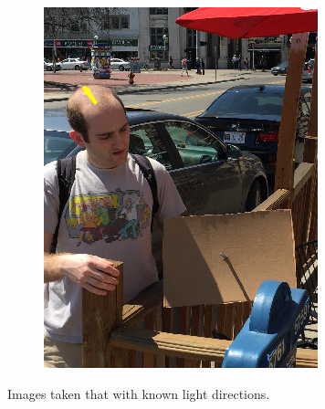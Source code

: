 \documentclass[10pt,twocolumn,letterpaper]{article}
\begin{document}
\begin{figure}[hbtp]
\begin{subfigure}{.5\linewidth}
  \caption{}
  \label{fig:sfig5}
\end{subfigure}
\begin{subfigure}{.5\linewidth}
  \centering
	\includegraphics[width=0.5\linewidth]{nathan_2.png}
  \caption{}
  \label{fig:sfig6}
\end{subfigure}
\caption{Images taken that with known light directions.}
\label{fig:images}
\end{figure}
\end{document}
